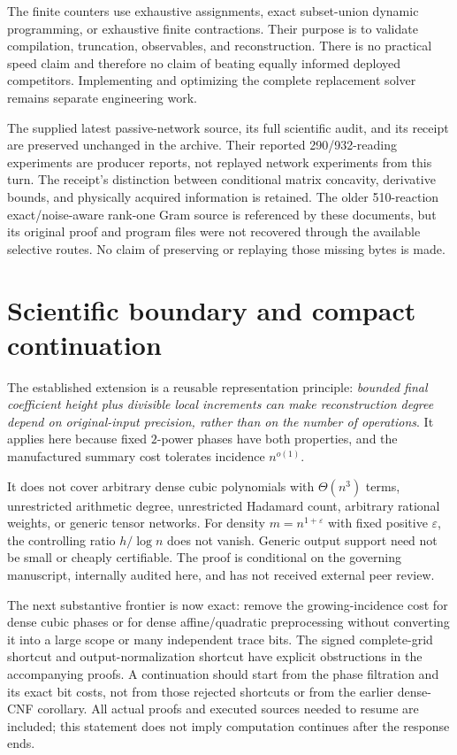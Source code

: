\documentclass[11pt,a4paper]{article}
\theoremstyle{remark}\newtheorem{remark}[theorem]{Remark}
\begin{document}
The finite counters use exhaustive assignments, exact subset-union dynamic
programming, or exhaustive finite contractions. Their purpose is to
validate compilation, truncation, observables, and reconstruction.
There is no practical speed claim and therefore no claim of beating
equally informed deployed competitors. Implementing and optimizing the
complete replacement solver remains separate engineering work.

The supplied latest passive-network source, its full scientific audit,
and its receipt are preserved unchanged in the archive. Their reported
290/932-reading experiments are producer reports, not replayed network
experiments from this turn. The receipt's distinction between conditional
matrix concavity, derivative bounds, and physically acquired information
is retained. The older 510-reaction exact/noise-aware rank-one Gram source
is referenced by these documents, but its original proof and program
files were not recovered through the available selective routes. No
claim of preserving or replaying those missing bytes is made.

\section{Scientific boundary and compact continuation}
The established extension is a reusable representation principle:
\emph{bounded final coefficient height plus divisible local increments
can make reconstruction degree depend on original-input precision,
rather than on the number of operations}. It applies here because
fixed $2$-power phases have both properties, and the manufactured
summary cost tolerates incidence $n^{o(1)}$.

It does not cover arbitrary dense cubic polynomials with $\Theta(n^3)$
terms, unrestricted arithmetic degree, unrestricted Hadamard count,
arbitrary rational weights, or generic tensor networks. For density
$m=n^{1+\varepsilon}$ with fixed positive $\varepsilon$, the controlling
ratio $h/\log n$ does not vanish. Generic output support need not be
small or cheaply certifiable. The proof is conditional on the governing
manuscript, internally audited here, and has not received external peer
review.

The next substantive frontier is now exact: remove the growing-incidence
cost for dense cubic phases or for dense affine/quadratic preprocessing
without converting it into a large scope or many independent trace bits.
The signed complete-grid shortcut and output-normalization shortcut have
explicit obstructions in the accompanying proofs. A continuation should
start from the phase filtration and its exact bit costs, not from those
rejected shortcuts or from the earlier dense-CNF corollary. All actual
proofs and executed sources needed to resume are included; this statement
does not imply computation continues after the response ends.
\end{document}
